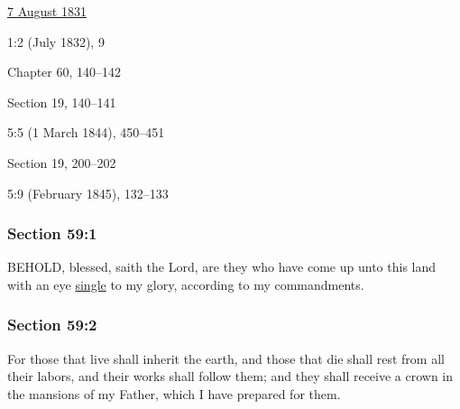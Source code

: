 		\begin{compactdesc}
			\item[JSP] \hyperref[EMS-1831-JS-7-AUG-1831]{7 August 1831}
			\item[EMS] 1:2 (July 1832), 9
			\item[BC] Chapter 60, 140--142
			\item[DC 1835] Section 19, 140--141
			\item[TS] 5:5 (1 March 1844), 450--451
			\item[DC 1844] Section 19, 200--202
			\item[MS] 5:9 (February 1845), 132--133
		\end{compactdesc}

	\subsubsection{Section 59:1} %
		\label{DC59-1}

		BEHOLD, blessed, saith the Lord, are they who have come up unto this land with an eye \hyperref[SINGLE]{single} to my glory, according to my commandments.


	\subsubsection{Section 59:2} %
		\label{DC59-2}

		For those that live shall inherit the earth, and those that die shall rest from all their labors, and their works shall follow them; and they shall receive a crown in the mansions of my Father, which I have prepared for them.


